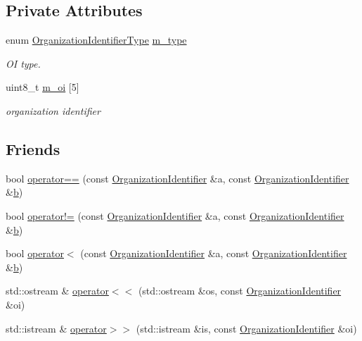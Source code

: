 \subsection*{Private Attributes}
\begin{DoxyCompactItemize}
\item 
enum \hyperlink{classns3_1_1OrganizationIdentifier_a196c774c611f936ef8b7d2a760ff5ba2}{Organization\+Identifier\+Type} \hyperlink{classns3_1_1OrganizationIdentifier_a5c49240c7eb405695bf6ccc6eda5e496}{m\+\_\+type}
\begin{DoxyCompactList}\small\item\em OI type. \end{DoxyCompactList}\item 
uint8\+\_\+t \hyperlink{classns3_1_1OrganizationIdentifier_ab0f1a9e4a1a40b0350fd5b52698a5dc7}{m\+\_\+oi} \mbox{[}5\mbox{]}
\begin{DoxyCompactList}\small\item\em organization identifier \end{DoxyCompactList}\end{DoxyCompactItemize}
\subsection*{Friends}
\begin{DoxyCompactItemize}
\item 
bool \hyperlink{classns3_1_1OrganizationIdentifier_ac94038f35f37214da035d416f5eda791}{operator==} (const \hyperlink{classns3_1_1OrganizationIdentifier}{Organization\+Identifier} \&a, const \hyperlink{classns3_1_1OrganizationIdentifier}{Organization\+Identifier} \&\hyperlink{lte__pathloss_8m_a21ad0bd836b90d08f4cf640b4c298e7c}{b})
\item 
bool \hyperlink{classns3_1_1OrganizationIdentifier_a0da143778e378a2d68572952ea235bc9}{operator!=} (const \hyperlink{classns3_1_1OrganizationIdentifier}{Organization\+Identifier} \&a, const \hyperlink{classns3_1_1OrganizationIdentifier}{Organization\+Identifier} \&\hyperlink{lte__pathloss_8m_a21ad0bd836b90d08f4cf640b4c298e7c}{b})
\item 
bool \hyperlink{classns3_1_1OrganizationIdentifier_a7da962c6cc544ed953383e334f440b39}{operator$<$} (const \hyperlink{classns3_1_1OrganizationIdentifier}{Organization\+Identifier} \&a, const \hyperlink{classns3_1_1OrganizationIdentifier}{Organization\+Identifier} \&\hyperlink{lte__pathloss_8m_a21ad0bd836b90d08f4cf640b4c298e7c}{b})
\item 
std\+::ostream \& \hyperlink{classns3_1_1OrganizationIdentifier_a466ddcd932f5736a8cb75e3901d4a364}{operator$<$$<$} (std\+::ostream \&os, const \hyperlink{classns3_1_1OrganizationIdentifier}{Organization\+Identifier} \&oi)
\item 
std\+::istream \& \hyperlink{classns3_1_1OrganizationIdentifier_a22e1fe747379de1fb2352ece92580942}{operator$>$$>$} (std\+::istream \&is, const \hyperlink{classns3_1_1OrganizationIdentifier}{Organization\+Identifier} \&oi)
\end{DoxyCompactItemize}


